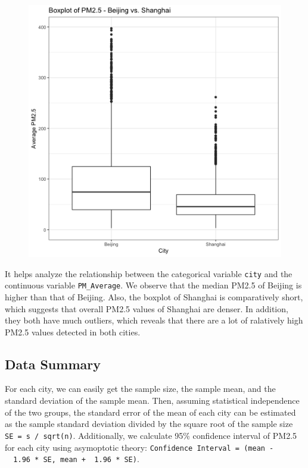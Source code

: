 \documentclass[]{article}
\begin{document}
\begin{figure}
\centering
\includegraphics{../results/boxplot.png}
\caption{}
\end{figure}

It helps analyze the relationship between the categorical variable
\texttt{city} and the continuous variable \texttt{PM\_Average}. We
observe that the median PM2.5 of Beijing is higher than that of Beijing.
Also, the boxplot of Shanghai is comparatively short, which suggests
that overall PM2.5 values of Shanghai are denser. In addition, they both
have much outliers, which reveals that there are a lot of ralatively
high PM2.5 values detected in both cities.

\subsection{Data Summary}\label{data-summary}

For each city, we can easily get the sample size, the sample mean, and
the standard deviation of the sample mean. Then, assuming statistical
independence of the two groups, the standard error of the mean of each
city can be estimated as the sample standard deviation divided by the
square root of the sample size \texttt{SE\ =\ s\ /\ sqrt(n)}.
Additionally, we calculate 95\% confidence interval of PM2.5 for each
city using asymoptotic theory:
\texttt{Confidence\ Interval\ =\ (mean\ -\ \ 1.96\ *\ SE,\ mean\ +\ \ 1.96\ *\ SE)}.
\end{document}
